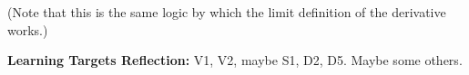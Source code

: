 \begin{enumerate}[leftmargin=0pt]
\begin{enumerate}
\begin{red}
            (Note that this is the same logic by which the limit definition of the derivative works.)
        \end{red}
    
    \end{enumerate}

\end{enumerate}

\begin{red}
\textbf{Learning Targets Reflection:} V1, V2, maybe S1, D2, D5. Maybe some others.
\end{red}

